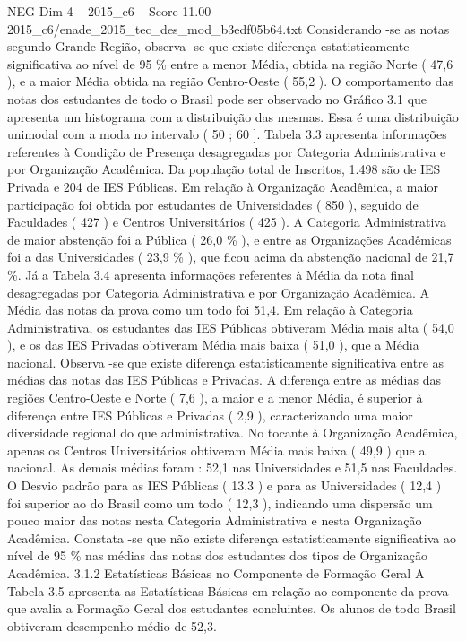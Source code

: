 \begin{textsample}{NEG Dim 4 – 2015\_c6 – Score 11.00 – 2015\_c6/enade\_2015\_tec\_des\_mod\_b3edf05b64.txt}
Considerando -se as notas segundo Grande Região, observa -se que existe diferença estatisticamente significativa ao nível de 95 \% entre a menor Média, obtida na região Norte ( 47,6 ), e a maior Média obtida na região Centro-Oeste ( 55,2 ).
O comportamento das notas dos estudantes de todo o Brasil pode ser observado no Gráfico 3.1 que apresenta um histograma com a distribuição das mesmas.
Essa é uma distribuição unimodal com a moda no intervalo ( 50 ; 60 ].
Tabela 3.3 apresenta informações referentes à Condição de Presença desagregadas por Categoria Administrativa e por Organização Acadêmica.
Da população total de Inscritos, 1.498 são de IES Privada e 204 de IES Públicas.
Em relação à Organização Acadêmica, a maior participação foi obtida por estudantes de Universidades ( 850 ), seguido de Faculdades ( 427 ) e Centros Universitários ( 425 ).
A Categoria Administrativa de maior abstenção foi a Pública ( 26,0 \% ), e entre as Organizações Acadêmicas foi a das Universidades ( 23,9 \% ), que ficou acima da abstenção nacional de 21,7 \%.
Já a Tabela 3.4 apresenta informações referentes à Média da nota final desagregadas por Categoria Administrativa e por Organização Acadêmica.
A Média das notas da prova como um todo foi 51,4.
Em relação à Categoria Administrativa, os estudantes das IES Públicas obtiveram Média mais alta ( 54,0 ), e os das IES Privadas obtiveram Média mais baixa ( 51,0 ), que a Média nacional.
Observa -se que existe diferença estatisticamente significativa entre as médias das notas das IES Públicas e Privadas.
A diferença entre as médias das regiões Centro-Oeste e Norte ( 7,6 ), a maior e a menor Média, é superior à diferença entre IES Públicas e Privadas ( 2,9 ), caracterizando uma maior diversidade regional do que administrativa.
No tocante à Organização Acadêmica, apenas os Centros Universitários obtiveram Média mais baixa ( 49,9 ) que a nacional.
As demais médias foram : 52,1 nas Universidades e 51,5 nas Faculdades.
O Desvio padrão para as IES Públicas ( 13,3 ) e para as Universidades ( 12,4 ) foi superior ao do Brasil como um todo ( 12,3 ), indicando uma dispersão um pouco maior das notas nesta Categoria Administrativa e nesta Organização Acadêmica.
Constata -se que não existe diferença estatisticamente significativa ao nível de 95 \% nas médias das notas dos estudantes dos tipos de Organização Acadêmica. 3.1.2 Estatísticas Básicas no Componente de Formação Geral A Tabela 3.5 apresenta as Estatísticas Básicas em relação ao componente da prova que avalia a Formação Geral dos estudantes concluintes.
Os alunos de todo Brasil obtiveram desempenho médio de 52,3.

\end{textsample}
